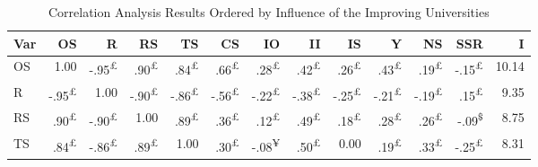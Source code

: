 \documentclass{singlecol-new}
\theoremstyle{TH}{
\newtheorem{lemma}{Lemma}
\newtheorem{theorem}[lemma]{Theorem}
\newtheorem{corrolary}[lemma]{Corrolary}
\newtheorem{conjecture}[lemma]{Conjecture}
\newtheorem{proposition}[lemma]{Proposition}
\newtheorem{claim}[lemma]{Claim}
\newtheorem{stheorem}[lemma]{Wrong Theorem}
\newtheorem{algorithm}{Algorithm}
}
\theoremstyle{THrm}{
\newtheorem{definition}{Definition}[section]
\newtheorem{question}{Question}[section]
\newtheorem{remark}{Remark}
\newtheorem{scheme}{Scheme}
}
\theoremstyle{THhit}{
\newtheorem{case}{Case}[section]
}
\begin{document}
\begin{table*}[h!]
	\centering
	\caption{Correlation Analysis Results Ordered by Influence of the Improving Universities}
	\label{tab:correlation_improving}
	\scriptsize
	\begin{tabular}{lrrrrrrrrrrrr}
		\hline
		\textbf{Var} & \textbf{OS} & \textbf{R} & \textbf{RS} & \textbf{TS} & \textbf{CS} & \textbf{IO} & \textbf{II} & \textbf{IS} & \textbf{Y} & \textbf{NS} & \textbf{SSR} & \textbf{I} \\ \hline
		
		OS & \cellcolor{gray!50}1.00 & \cellcolor{gray!48}-.95\textsuperscript{£} & \cellcolor{gray!45}.90\textsuperscript{£} & \cellcolor{gray!42}.84\textsuperscript{£} & \cellcolor{gray!33}.66\textsuperscript{£} & \cellcolor{gray!14}.28\textsuperscript{£} & \cellcolor{gray!21}.42\textsuperscript{£} & \cellcolor{gray!13}.26\textsuperscript{£} & \cellcolor{gray!22}.43\textsuperscript{£} & \cellcolor{gray!09}.19\textsuperscript{£} & \cellcolor{gray!07}-.15\textsuperscript{£} & 10.14 \\
		R & \cellcolor{gray!48}-.95\textsuperscript{£} & \cellcolor{gray!50}1.00 & \cellcolor{gray!45}-.90\textsuperscript{£} & \cellcolor{gray!43}-.86\textsuperscript{£} & \cellcolor{gray!28}-.56\textsuperscript{£} & \cellcolor{gray!11}-.22\textsuperscript{£} & \cellcolor{gray!19}-.38\textsuperscript{£} & \cellcolor{gray!13}-.25\textsuperscript{£} & \cellcolor{gray!10}-.21\textsuperscript{£} & \cellcolor{gray!09}-.19\textsuperscript{£} & \cellcolor{gray!07}.15\textsuperscript{£} & 9.35 \\
		RS & \cellcolor{gray!45}.90\textsuperscript{£} & \cellcolor{gray!45}-.90\textsuperscript{£} & \cellcolor{gray!50}1.00 & \cellcolor{gray!45}.89\textsuperscript{£} & \cellcolor{gray!18}.36\textsuperscript{£} & \cellcolor{gray!06}.12\textsuperscript{£} & \cellcolor{gray!24}.49\textsuperscript{£} & \cellcolor{gray!09}.18\textsuperscript{£} & \cellcolor{gray!14}.28\textsuperscript{£} & \cellcolor{gray!13}.26\textsuperscript{£} & \cellcolor{gray!05}-.09\textsuperscript{\$} & 8.75 \\
		TS & \cellcolor{gray!42}.84\textsuperscript{£} & \cellcolor{gray!43}-.86\textsuperscript{£} & \cellcolor{gray!45}.89\textsuperscript{£} & \cellcolor{gray!50}1.00 & \cellcolor{gray!15}.30\textsuperscript{£} & \cellcolor{gray!04}-.08\textsuperscript{¥} & \cellcolor{gray!25}.50\textsuperscript{£} & 0.00 & \cellcolor{gray!09}.19\textsuperscript{£} & \cellcolor{gray!17}.33\textsuperscript{£} & \cellcolor{gray!13}-.25\textsuperscript{£} & 8.31 \\

\end{tabular}
\end{table*}
\end{document}
